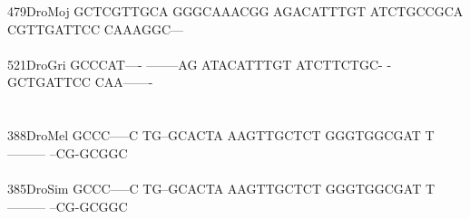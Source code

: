 \documentclass[11pt,twoside,reqno,a4paper]{article}
\begin{document}
{479\hspace*{1\charwidth}DroMoj	GCTCGTTGCA	GGGCAAACGG	AGACATTTGT	ATCTGCCGCA	CGTTGATTCC	CAAAGGC---	\\
\hspace*{4\charwidth}\hspace*{7\charwidth}\hspace*{1\charwidth}\hspace*{1\charwidth}\hspace*{1\charwidth}\hspace*{1\charwidth}\hspace*{1\charwidth}\hspace*{1\charwidth}\\
521\hspace*{1\charwidth}DroGri	GCCCAT----	--------AG	ATACATTTGT	ATCTTCTGC-	-GCTGATTCC	CAA-------	\\
\hspace*{4\charwidth}\hspace*{7\charwidth}\hspace*{1\charwidth}\hspace*{1\charwidth}\hspace*{1\charwidth}\hspace*{1\charwidth}\hspace*{1\charwidth}\hspace*{1\charwidth}\\
\\
388\hspace*{1\charwidth}DroMel	GCCC-----C	TG--GCACTA	AAGTTGCTCT	GGGTGGCGAT	T---------	--CG-GCGGC	\\
\hspace*{4\charwidth}\hspace*{7\charwidth}\hspace*{1\charwidth}\hspace*{1\charwidth}\hspace*{1\charwidth}\hspace*{1\charwidth}\hspace*{1\charwidth}\hspace*{1\charwidth}\\
385\hspace*{1\charwidth}DroSim	GCCC-----C	TG--GCACTA	AAGTTGCTCT	GGGTGGCGAT	T---------	--CG-GCGGC	\\
\hspace*{4\charwidth}\hspace*{7\charwidth}\hspace*{1\charwidth}\hspace*{1\charwidth}\hspace*{1\charwidth}\hspace*{1\charwidth}\hspace*{1\charwidth}\hspace*{1\charwidth}\\
}
\end{document}
